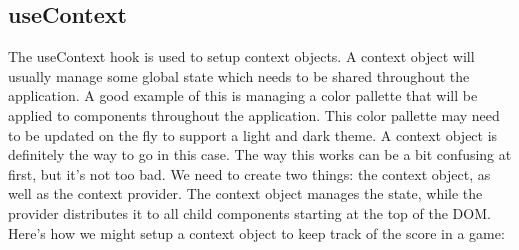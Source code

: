 \documentclass{article}
\begin{document}

\subsection{useContext}

The useContext hook is used to setup context objects. A context object will usually manage some global state
which needs to be shared throughout the application. A good example of this is managing a color pallette that
will be applied to components throughout the application. This color pallette may need to be updated on the fly
to support a light and dark theme. A context object is definitely the way to go in this case. The way this
works can be a bit confusing at first, but it's not too bad. We need to create two things: the context object,
as well as the context provider. The context object manages the state, while the provider distributes it to all
child components starting at the top of the DOM. Here's how we might setup a context object to keep track of
the score in a game:
\end{document}
